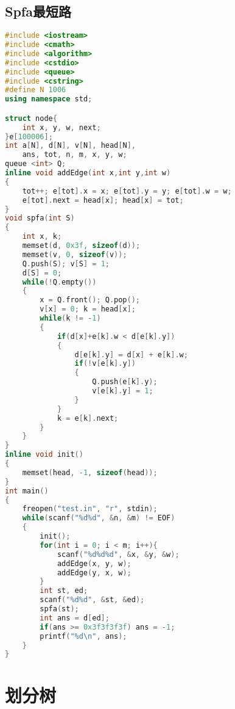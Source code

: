 \subsection{Spfa最短路}
\begin{lstlisting}[language=C++]
#include <iostream>
#include <cmath>
#include <algorithm>
#include <cstdio>
#include <queue>
#include <cstring>
#define N 1006
using namespace std;

struct node{
    int x, y, w, next;
}e[100006];
int a[N], d[N], v[N], head[N],
    ans, tot, n, m, x, y, w;
queue <int> Q;
inline void addEdge(int x,int y,int w)
{
    tot++; e[tot].x = x; e[tot].y = y; e[tot].w = w;
    e[tot].next = head[x]; head[x] = tot;
}
void spfa(int S)
{
    int x, k;
    memset(d, 0x3f, sizeof(d));
    memset(v, 0, sizeof(v));
    Q.push(S); v[S] = 1;
    d[S] = 0;
    while(!Q.empty())
    {
        x = Q.front(); Q.pop();
        v[x] = 0; k = head[x];
        while(k != -1)
        {
            if(d[x]+e[k].w < d[e[k].y])
            {
                d[e[k].y] = d[x] + e[k].w;
                if(!v[e[k].y])
                {
                    Q.push(e[k].y);
                    v[e[k].y] = 1;
                }
            }
            k = e[k].next;
        }
    }
}
inline void init()
{
    memset(head, -1, sizeof(head));
}
int main()
{
    freopen("test.in", "r", stdin);
    while(scanf("%d%d", &n, &m) != EOF)
    {
        init();	
        for(int i = 0; i < m; i++){
            scanf("%d%d%d", &x, &y, &w);
            addEdge(x, y, w);
            addEdge(y, x, w);
        }
        int st, ed;
        scanf("%d%d", &st, &ed);
        spfa(st);
        int ans = d[ed];
        if(ans >= 0x3f3f3f3f) ans = -1;
        printf("%d\n", ans);
    }
}
\end{lstlisting}

\section{划分树}
